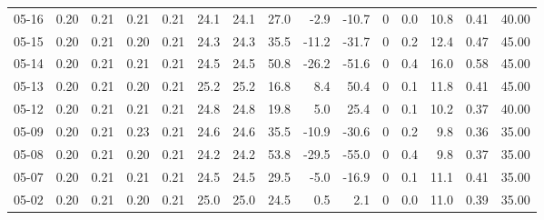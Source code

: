 \begin{threeparttable}
{\begin{tabular}{lrrrrrrrrrrrrrr}
  05-16 &          0.20 &          0.21 &          0.21 &        0.21 &                24.1 &               24.1 &                27.0 &       -2.9 &        -10.7 &              0 &                 0.0 &             10.8 &            0.41 &                  40.00 \\
  05-15 &          0.20 &          0.21 &          0.20 &        0.21 &                24.3 &               24.3 &                35.5 &      -11.2 &        -31.7 &              0 &                 0.2 &             12.4 &            0.47 &                  45.00 \\
  05-14 &          0.20 &          0.21 &          0.21 &        0.21 &                24.5 &               24.5 &                50.8 &      -26.2 &        -51.6 &              0 &                 0.4 &             16.0 &            0.58 &                  45.00 \\
  05-13 &          0.20 &          0.21 &          0.20 &        0.21 &                25.2 &               25.2 &                16.8 &        8.4 &         50.4 &              0 &                 0.1 &             11.8 &            0.41 &                  45.00 \\
  05-12 &          0.20 &          0.21 &          0.21 &        0.21 &                24.8 &               24.8 &                19.8 &        5.0 &         25.4 &              0 &                 0.1 &             10.2 &            0.37 &                  40.00 \\
  05-09 &          0.20 &          0.21 &          0.23 &        0.21 &                24.6 &               24.6 &                35.5 &      -10.9 &        -30.6 &              0 &                 0.2 &              9.8 &            0.36 &                  35.00 \\
  05-08 &          0.20 &          0.21 &          0.20 &        0.21 &                24.2 &               24.2 &                53.8 &      -29.5 &        -55.0 &              0 &                 0.4 &              9.8 &            0.37 &                  35.00 \\
  05-07 &          0.20 &          0.21 &          0.21 &        0.21 &                24.5 &               24.5 &                29.5 &       -5.0 &        -16.9 &              0 &                 0.1 &             11.1 &            0.41 &                  35.00 \\
  05-02 &          0.20 &          0.21 &          0.20 &        0.21 &                25.0 &               25.0 &                24.5 &        0.5 &          2.1 &              0 &                 0.0 &             11.0 &            0.39 &                  35.00 \\

\end{tabular}}
\end{threeparttable}
